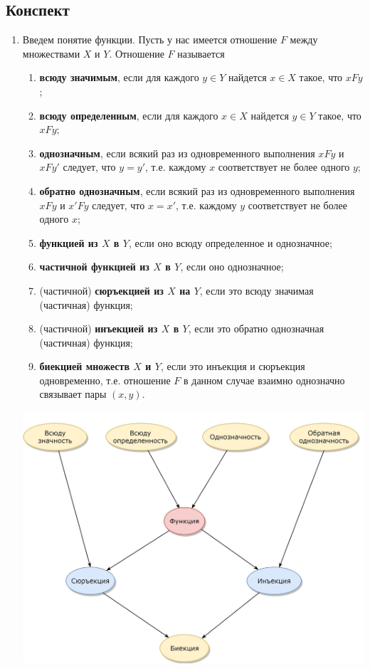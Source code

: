 \subsection*{Конспект}

\begin{enumerate}
\item Введем понятие функции. Пусть у нас имеется отношение $F$ между множествами $X$ и $Y$. Отношение $F$ называется
\begin{enumerate}[{\bf Func1}]
\item \textbf{всюду значимым}, если для каждого $y\in Y$ найдется $x\in X$ такое, что $xFy$;
\item \textbf{всюду определенным}, если для каждого $x\in X$ найдется $y\in Y$ такое, что $xFy$;
\item \textbf{однозначным}, если всякий раз из одновременного выполнения $xFy$ и $xFy'$ следует, что $y=y'$, т.е. каждому $x$ соответствует не более одного $y$;
\item \textbf{обратно однозначным}, если всякий раз из одновременного выполнения $xFy$ и $x'Fy$ следует, что $x=x'$, т.е. каждому $y$ соответствует не более одного $x$;
\item \textbf{функцией из $X$ в $Y$}, если оно всюду определенное и однозначное;
\item \textbf{частичной функцией из $X$ в $Y$}, если оно однозначное;
\item (частичной) \textbf{сюръекцией из $X$ на $Y$}, если это всюду значимая (частичная) функция;
\item (частичной) \textbf{инъекцией из $X$ в $Y$}, если это обратно однозначная (частичная) функция;
\item \textbf{биекцией множеств $X$ и $Y$}, если это инъекция и сюръекция одновременно, т.е. отношение $F$ в данном случае взаимно однозначно связывает пары $(x,y)$.
\end{enumerate}
\begin{center}
\includegraphics[scale=0.3]{function.png}
\end{center}


\end{enumerate}
